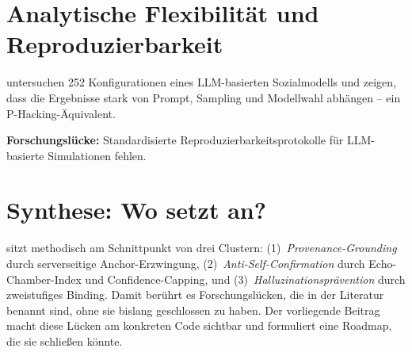 \section{Analytische Flexibilität und Reproduzierbarkeit}\label{sec:flexibility}

\cite{analyticflexibility} untersuchen 252 Konfigurationen eines LLM-basierten Sozialmodells und zeigen, dass die Ergebnisse stark von Prompt, Sampling und Modellwahl abhängen -- ein P-Hacking-Äquivalent.

\textbf{Forschungslücke:} Standardisierte Reproduzierbarkeitsprotokolle für LLM-basierte Simulationen fehlen.

\section{Synthese: Wo setzt \agora{} an?}\label{sec:synthese}

\agora{} sitzt methodisch am Schnittpunkt von drei Clustern: (1)~\emph{Provenance-Grounding} durch serverseitige Anchor-Erzwingung, (2)~\emph{Anti-Self-Confirmation} durch Echo-Chamber-Index und Confidence-Capping, und (3)~\emph{Halluzinationsprävention} durch zweistufiges Binding. Damit berührt es Forschungslücken, die in der Literatur benannt sind, ohne sie bislang geschlossen zu haben. Der vorliegende Beitrag macht diese Lücken am konkreten Code sichtbar und formuliert eine Roadmap, die sie schließen könnte.